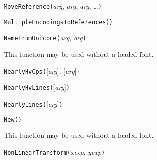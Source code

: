 
\texttt{MoveReference(}\textit{arg}, \textit{arg}, \textit{arg}, \ldots\texttt{)}



\texttt{MultipleEncodingsToReferences(}\texttt{)}



\texttt{NameFromUnicode(}\textit{arg}, \textit{arg}\texttt{)}

This function may be used without a loaded font.



\texttt{NearlyHvCps(}[\textit{arg}], [\textit{arg}]\texttt{)}



\texttt{NearlyHvLines(}[\textit{arg}]\texttt{)}



\texttt{NearlyLines(}[\textit{arg}]\texttt{)}



\texttt{New(}\texttt{)}

This function may be used without a loaded font.



\texttt{NonLinearTransform(}\textit{xexp}, \textit{yexp}\texttt{)}

